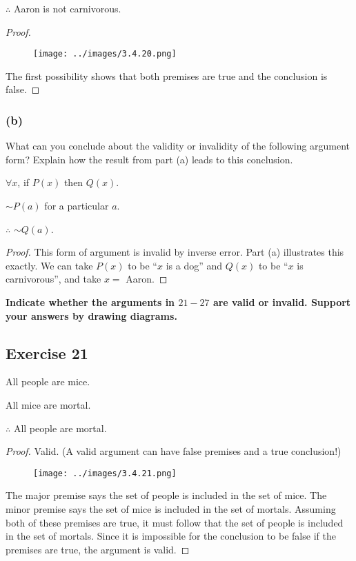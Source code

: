 \documentclass[14pt]{extarticle}
\newcommand{\fa}{\forall}
\begin{document}
$\therefore$ Aaron is not carnivorous.

\begin{proof}
    \begin{figure}[ht!]
        \centering
        \texttt{[image: ../images/3.4.20.png]}
    \end{figure}
    The first possibility shows that both premises are true and the conclusion is false.
\end{proof}

\subsubsection{(b)}
What can you conclude about the validity or invalidity of the following argument form? Explain how the result from part (a) leads to this conclusion.

$\fa x$, if $P(x)$ then $Q(x)$.

$\sim P(a)$ for a particular $a$.

$\therefore$ $\sim Q(a)$.

\begin{proof}
    This form of argument is invalid by inverse error. Part (a) illustrates this exactly. We can take $P(x)$ to be ``$x$ is a dog'' and $Q(x)$ to be ``$x$ is carnivorous'', and take $x =$ Aaron.
\end{proof}

{\bf \color{cyan} Indicate whether the arguments in $21-27$ are valid or invalid. Support your answers by drawing diagrams.}

\subsection{Exercise 21}
All people are mice.

All mice are mortal.

$\therefore$ All people are mortal.

\begin{proof}
    Valid. (A valid argument can have false premises and a
    true conclusion!)
    \begin{figure}[ht!]
        \centering
        \texttt{[image: ../images/3.4.21.png]}
    \end{figure}

    The major premise says the set of people is included in the set of mice. The minor premise says the set of mice is included in the set of mortals. Assuming both of these premises are true, it must follow that the set of people is included in the set of mortals. Since it is impossible for the conclusion to be false if the premises are true, the argument is valid.
\end{proof}
\end{document}
